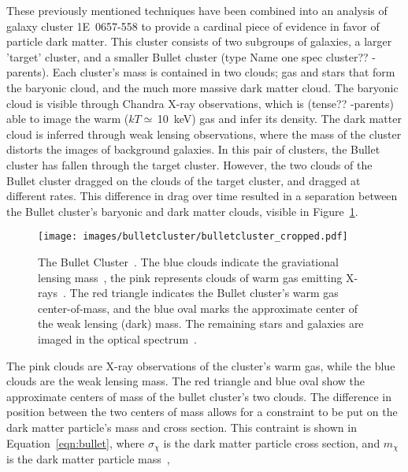 These previously mentioned techniques have been combined into an analysis of galaxy cluster \mbox{1E 0657-558} to provide a cardinal piece of evidence in favor of particle dark matter.
This cluster consists of two subgroups of galaxies, a larger 'target' cluster, and a smaller Bullet cluster {\color{red}(type Name one spec cluster?? -parents)}.
Each cluster's mass is contained in two clouds; gas and stars that form the baryonic cloud, and the much more massive dark matter cloud.
The baryonic cloud is visible through Chandra X-ray observations, which {\color{red}is (tense?? -parents)} able to image the warm ($kT\simeq\,$\SI{10}{keV}) gas and infer its density.
The dark matter cloud is inferred through weak lensing observations, where the mass of the cluster distorts the images of background galaxies.
In this pair of clusters, the Bullet cluster has fallen through the target cluster.
However, the two clouds of the Bullet cluster dragged on the clouds of the target cluster, and dragged at different rates.
This difference in drag over time resulted in a separation between the Bullet cluster's baryonic and dark matter clouds, visible in Figure~\ref{fig:bullet}.

\begin{figure}[!ht]
  \centering
  \texttt{[image: images/bulletcluster/bulletcluster\_cropped.pdf]}
  \caption[The Bullet Cluster]{
    The Bullet Cluster~\cite{bullet_cluster_combined_image}.
    The blue clouds indicate the graviational lensing mass~\cite{bullet_cluster}, the pink represents clouds of warm gas emitting X-rays~\cite{bullet_cluster_chandramap}.
    The red triangle indicates the Bullet cluster's warm gas center-of-mass, and the blue oval marks the approximate center of the weak lensing (dark) mass.
    The remaining stars and galaxies are imaged in the optical spectrum~\cite{bullet_cluster_composite}.}
  \label{fig:bullet}
\end{figure}
    
The pink clouds are X-ray observations of the cluster's warm gas, while the blue clouds are the weak lensing mass.
The red triangle and blue oval show the approximate centers of mass of the bullet cluster's two clouds.
The difference in position between the two centers of mass allows for a constraint to be put on the dark matter particle's mass and cross section.
This contraint is shown in Equation~\ref{eqn:bullet}, where $\sigma_{\chi}$ is the dark matter particle cross section, and $m_{\chi}$ is the dark matter particle mass~\cite{bullet_cluster,bullet_cluster2},

